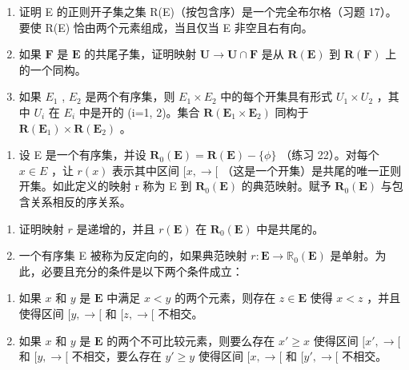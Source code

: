 \begin{enumerate}
\def\labelenumi{(\alph{enumi})}
\setcounter{enumi}{1}
\item
  证明 E 的正则开子集之集 R(E)（按包含序）是一个完全布尔格（习题 17）。要使 R(E) 恰由两个元素组成，当且仅当 E 非空且右有向。
\item
  如果 \(\mathbf{F}\) 是 \(\mathbf{E}\) 的共尾子集，证明映射 \(\mathbf{U} \to \mathbf{U} \cap \mathbf{F}\) 是从 \(\mathbf{R}(\mathbf{E})\) 到 \(\mathbf{R}(\mathbf{F})\) 上的一个同构。
\item
  如果 \(E_{1}\) , \(E_{2}\) 是两个有序集，则 \(E_{1} \times E_{2}\) 中的每个开集具有形式 \(U_{1} \times U_{2}\) ，其中 \(U_{i}\) 在 \(E_{i}\) 中是开的 (i=1, 2)。集合 \(\mathbf{R}(\mathbf{E}_{1} \times \mathbf{E}_{2})\) 同构于 \(\mathbf{R}(\mathbf{E}_{1}) \times \mathbf{R}(\mathbf{E}_{2})\) 。
\end{enumerate}

\begin{enumerate}
\def\labelenumi{\arabic{enumi}.}
\setcounter{enumi}{22}
\tightlist
\item
  设 E 是一个有序集，并设 \(\mathbf{R}_{0}(\mathbf{E}) = \mathbf{R}(\mathbf{E}) - \{\phi\}\) （练习 22）。对每个 \(x \in E\) ，让 \(r(x)\) 表示其中区间 \([x, \rightarrow[\) （这是一个开集）是共尾的唯一正则开集。如此定义的映射 r 称为 E 到 \(\mathbf{R}_{0}(\mathbf{E})\) 的典范映射。赋予 \(\mathbf{R}_{0}(\mathbf{E})\) 与包含关系相反的序关系。
\end{enumerate}

\begin{enumerate}
\def\labelenumi{(\alph{enumi})}
\item
  证明映射 \(r\) 是递增的，并且 \(r(\mathbf{E})\) 在 \(\mathbf{R}_0(\mathbf{E})\) 中是共尾的。
\item
  一个有序集 E 被称为反定向的，如果典范映射 \(r: \mathbf{E} \to \mathbb{R}_{0}(\mathbf{E})\) 是单射。为此，必要且充分的条件是以下两个条件成立：
\end{enumerate}

\begin{enumerate}
\def\labelenumi{(\Roman{enumi})}
\item
  如果 \(x\) 和 \(y\) 是 \(\mathbf{E}\) 中满足 \(x < y\) 的两个元素，则存在 \(z \in \mathbf{E}\) 使得 \(x < z\) ，并且使得区间 \([y, \rightarrow[\) 和 \([z, \rightarrow[\) 不相交。
\item
  如果 \(x\) 和 \(y\) 是 \(\mathbf{E}\) 的两个不可比较元素，则要么存在 \(x' \geqslant x\) 使得区间 \([x', \rightarrow[\) 和 \([y, \rightarrow[\) 不相交，要么存在 \(y' \geqslant y\) 使得区间 \([x, \rightarrow[\) 和 \([y', \rightarrow[\) 不相交。
\end{enumerate}

